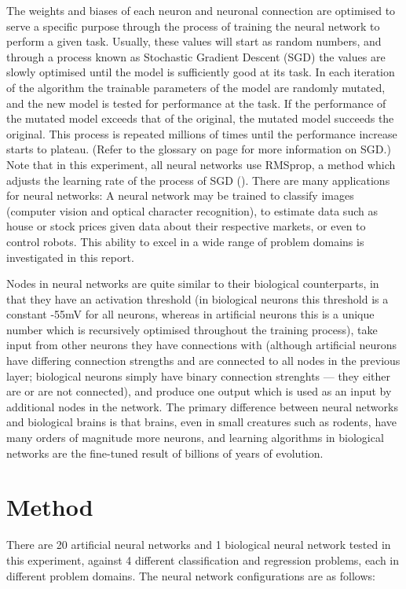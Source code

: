 \documentclass[]{report}
\begin{document}
The weights and biases of each neuron and neuronal connection are optimised to serve a specific purpose through the process of training the neural network to perform a given task. Usually, these values will start as random numbers, and through a process known as Stochastic Gradient Descent (SGD) the values are slowly optimised until the model is sufficiently good at its task. In each iteration of the algorithm the trainable parameters of the model are randomly mutated, and the new model is tested for performance at the task. If the performance of the mutated model exceeds that of the original, the mutated model succeeds the original. This process is repeated millions of times until the performance increase starts to plateau. (Refer to the glossary on page \pageref{itm:SGD} for more information on SGD.) Note that in this experiment, all neural networks use RMSprop, a method which adjusts the learning rate of the process of SGD (\cite{hinton2012neural}). There are many applications for neural networks: A neural network may be trained to classify images (computer vision and optical character recognition), to estimate data such as house or stock prices given data about their respective markets, or even to control robots. This ability to excel in a wide range of problem domains is investigated in this report.

Nodes in neural networks are quite similar to their biological counterparts, in that they have an activation threshold (in biological neurons this threshold is a constant -55mV for all neurons, whereas in artificial neurons this is a unique number which is recursively optimised throughout the training process), take input from other neurons they have connections with (although artificial neurons have differing connection strengths and are connected to all nodes in the previous layer; biological neurons simply have binary connection strenghts --- they either are or are not connected), and produce one output which is used as an input by additional nodes in the network. The primary difference between neural networks and biological brains is that brains, even in small creatures such as rodents, have many orders of magnitude more neurons, and learning algorithms in biological networks are the fine-tuned result of billions of years of evolution.

\label{itm:Method}
\section{Method}

There are 20 artificial neural networks and 1 biological neural network tested in this experiment, against 4 different classification and regression problems, each in different problem domains. The neural network configurations are as follows:
\end{document}

